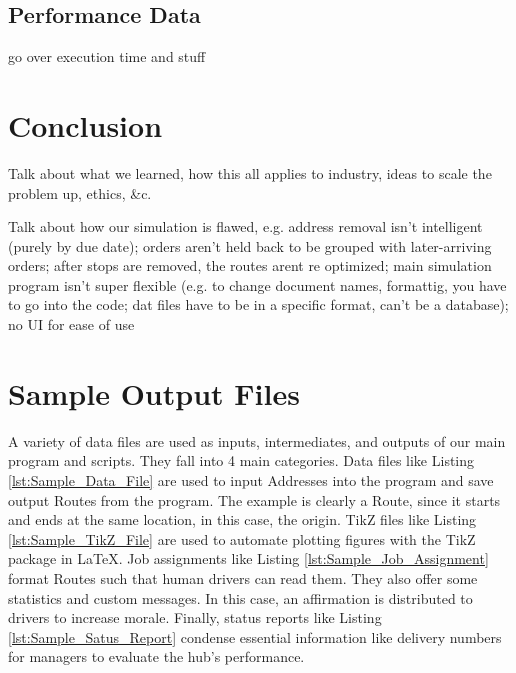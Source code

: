 \documentclass[letterpaper]{article}
\begin{document}
    \subsection{Performance Data}
    go over execution time and stuff

    \section{Conclusion}
    \label{section:Conclusion}
    Talk about what we learned, how this all applies to industry, ideas to scale the problem up, ethics, \&c.

    Talk about how our simulation is flawed, e.g. address removal isn't intelligent (purely by due date); orders aren't held back to be grouped with later-arriving orders; after stops are removed, the routes arent re optimized; main simulation program isn't super flexible (e.g. to change document names, formattig, you have to go into the code; dat files have to be in a specific format, can't be a database); no UI for ease of use

    \appendix
    \section{Sample Output Files}
    \label{appendix:Sample_Output_Files}

    A variety of data files are used as inputs, intermediates, and outputs of our main program and scripts. They fall into 4 main categories. Data files like Listing \ref{lst:Sample_Data_File} are used to input Addresses into the program and save output Routes from the program. The example is clearly a Route, since it starts and ends at the same location, in this case, the origin. TikZ files like Listing \ref{lst:Sample_TikZ_File} are used to automate plotting figures with the TikZ package in \LaTeX . Job assignments like Listing \ref{lst:Sample_Job_Assignment} format Routes such that human drivers can read them. They also offer some statistics and custom messages. In this case, an affirmation is distributed to drivers to increase morale. Finally, status reports like Listing \ref{lst:Sample_Satus_Report} condense essential information like delivery numbers for managers to evaluate the hub's performance.

    

    

    

    

    
    
\end{document}

